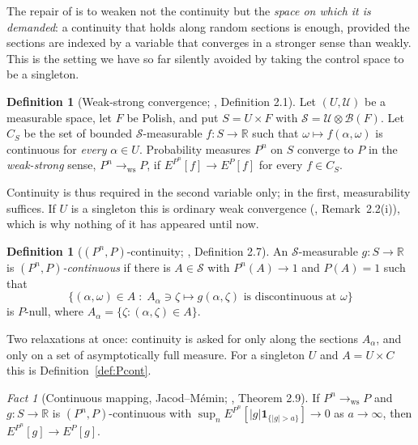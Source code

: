 \documentclass[11pt,a4paper]{article}
\theoremstyle{plain}
\theoremstyle{definition}
\newtheorem{definition}[theorem]{Definition}
\theoremstyle{remark}
\newtheorem{fact}[theorem]{Fact}
\newcommand{\R}{\mathbb{R}}
\newcommand{\Bor}{\mathcal{B}}                 %
\newcommand{\one}{\mathbf{1}}
\newcommand{\CPS}{\cite{CPS23}}
\begin{document}
The repair of \CPS{} is to weaken not the continuity but the \emph{space on which
it is demanded}: a continuity that holds along random sections is enough, provided
the sections are indexed by a variable that converges in a stronger sense than
weakly.  This is the setting we have so far silently avoided by taking the control
space to be a singleton.

\begin{definition}[Weak-strong convergence; \CPS, Definition 2.1]
  \label{def:weakstrong}
  Let $(U,\mathcal{U})$ be a measurable space, let $F$ be Polish, and put
  $S = U \times F$ with $\mathcal{S} = \mathcal{U} \otimes \Bor(F)$.  Let $C_S$ be
  the set of bounded $\mathcal{S}$-measurable $f : S \to \R$ such that
  $\omega \mapsto f(\alpha,\omega)$ is continuous for \emph{every} $\alpha \in U$.
  Probability measures $P^n$ on $S$ converge to $P$ in the \emph{weak-strong}
  sense, $P^n \to_{\mathrm{ws}} P$, if $E^{P^n}[f] \to E^P[f]$ for every
  $f \in C_S$.
\end{definition}

Continuity is thus required in the second variable only; in the first, measurability
suffices.  If $U$ is a singleton this is ordinary weak convergence
(\CPS, Remark~2.2(i)), which is why nothing of it has appeared until now.

\begin{definition}[$(P^n,P)$-continuity; \CPS, Definition 2.7]
  \label{def:PnPcont}
  An $\mathcal{S}$-measurable $g : S \to \R$ is \emph{$(P^n,P)$-continuous} if
  there is $A \in \mathcal{S}$ with $P^n(A) \to 1$ and $P(A) = 1$ such that
  \[
    \bigl\{ (\alpha,\omega) \in A \;:\;
      A_\alpha \ni \zeta \mapsto g(\alpha,\zeta) \text{ is discontinuous at } \omega \bigr\}
  \]
  is $P$-null, where $A_\alpha = \{\zeta : (\alpha,\zeta) \in A\}$.
\end{definition}

Two relaxations at once: continuity is asked for only along the sections
$A_\alpha$, and only on a set of asymptotically full measure.  For a singleton
$U$ and $A = U \times C$ this is Definition~\ref{def:Pcont}.

\begin{fact}[Continuous mapping, Jacod--M\'emin; \CPS, Theorem 2.9]
  \label{fact:jacodmemin}
  If $P^n \to_{\mathrm{ws}} P$ and $g : S \to \R$ is $(P^n,P)$-continuous with
  $\sup_n E^{P^n}[|g| \one_{\{|g|>a\}}] \to 0$ as $a \to \infty$, then
  $E^{P^n}[g] \to E^P[g]$.
\end{fact}
\end{document}
